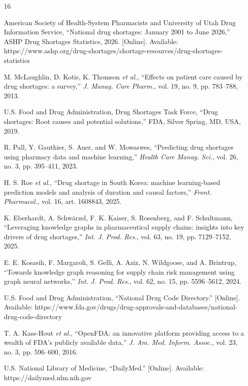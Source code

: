\documentclass[conference,letterpaper]{IEEEtran}
\begin{document}
\begin{thebibliography}{16}

 American Society of Health-System Pharmacists and University of
Utah Drug Information Service, ``National drug shortages: January 2001 to June
2026,'' ASHP Drug Shortages Statistics, 2026. [Online]. Available:
https://www.ashp.org/drug-shortages/shortage-resources/drug-shortages-statistics

 M. McLaughlin, D. Kotis, K. Thomson \emph{et al.},
``Effects on patient care caused by drug shortages: a survey,'' \emph{J.
Manag. Care Pharm.}, vol. 19, no. 9, pp. 783--788, 2013.

 U.S. Food and Drug Administration, Drug Shortages Task
Force, ``Drug shortages: Root causes and potential solutions,'' FDA, Silver
Spring, MD, USA, 2019.

 R. Pall, Y. Gauthier, S. Auer, and W. Mowaswes, ``Predicting drug
shortages using pharmacy data and machine learning,'' \emph{Health Care Manag.
Sci.}, vol. 26, no. 3, pp. 395--411, 2023.

 H. S. Roe \emph{et al.}, ``Drug shortage in South Korea: machine
learning-based prediction models and analysis of duration and causal factors,''
\emph{Front. Pharmacol.}, vol. 16, art. 1608843, 2025.

 K. Eberhardt, A. Schw\"arzel, F. K. Kaiser, S. Rosenberg,
and F. Schultmann, ``Leveraging knowledge graphs in pharmaceutical supply
chains: insights into key drivers of drug shortages,'' \emph{Int. J. Prod.
Res.}, vol. 63, no. 19, pp. 7129--7152, 2025.

 E. E. Kosasih, F. Margaroli, S. Gelli, A. Aziz, N. Wildgoose,
and A. Brintrup, ``Towards knowledge graph reasoning for supply chain risk
management using graph neural networks,'' \emph{Int. J. Prod. Res.}, vol. 62,
no. 15, pp. 5596--5612, 2024.

 U.S. Food and Drug Administration, ``National Drug Code
Directory.'' [Online]. Available:
https://www.fda.gov/drugs/drug-approvals-and-databases/national-drug-code-directory

 T. A. Kass-Hout \emph{et al.}, ``OpenFDA: an innovative
platform providing access to a wealth of FDA's publicly available data,''
\emph{J. Am. Med. Inform. Assoc.}, vol. 23, no. 3, pp. 596--600, 2016.

 U.S. National Library of Medicine, ``DailyMed.'' [Online].
Available: https://dailymed.nlm.nih.gov


\end{thebibliography}
\end{document}
